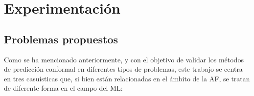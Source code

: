 \chapter{Experimentación}



\section{Problemas propuestos}

Como se ha mencionado anteriormente, y con el objetivo de validar los métodos de predicción conformal en diferentes tipos de problemas, este trabajo se centra en tres casuísticas que, si bien están relacionadas en el ámbito de la \acrshort{AF}, se tratan de diferente forma en el campo del \acrshort{ML}: 

